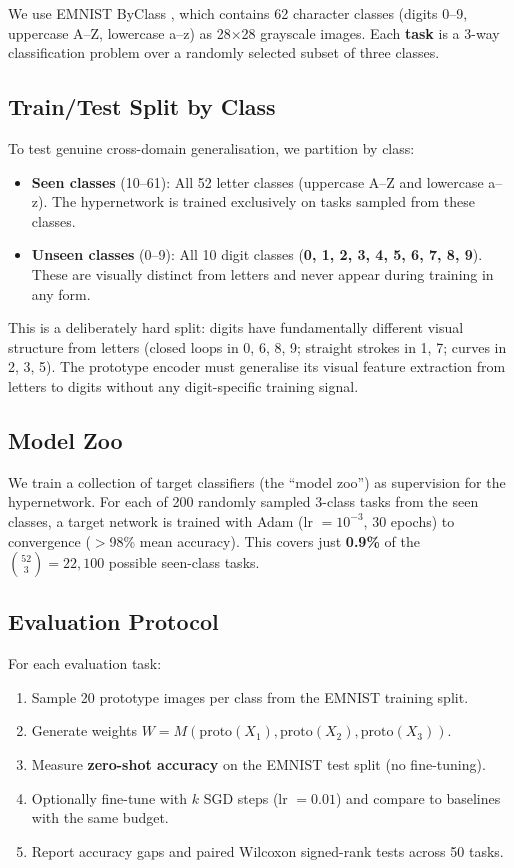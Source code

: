 \documentclass[11pt,a4paper]{article}
\begin{document}
We use EMNIST ByClass \cite{cohen2017emnist}, which contains 62 character classes (digits 0--9, uppercase A--Z, lowercase a--z) as 28$\times$28 grayscale images. Each \textbf{task} is a 3-way classification problem over a randomly selected subset of three classes.

\subsection{Train/Test Split by Class}

To test genuine cross-domain generalisation, we partition by class:
\begin{itemize}[noitemsep]
    \item \textbf{Seen classes} (10--61): All 52 letter classes (uppercase A--Z and lowercase a--z). The hypernetwork is trained exclusively on tasks sampled from these classes.
    \item \textbf{Unseen classes} (0--9): All 10 digit classes (\textbf{0, 1, 2, 3, 4, 5, 6, 7, 8, 9}). These are visually distinct from letters and never appear during training in any form.
\end{itemize}

This is a deliberately hard split: digits have fundamentally different visual structure from letters (closed loops in 0, 6, 8, 9; straight strokes in 1, 7; curves in 2, 3, 5). The prototype encoder must generalise its visual feature extraction from letters to digits without any digit-specific training signal.

\subsection{Model Zoo}

We train a collection of target classifiers (the ``model zoo'') as supervision for the hypernetwork. For each of 200 randomly sampled 3-class tasks from the seen classes, a target network is trained with Adam (lr $= 10^{-3}$, 30 epochs) to convergence ($>$98\% mean accuracy). This covers just \textbf{0.9\%} of the $\binom{52}{3} = 22{,}100$ possible seen-class tasks.

\subsection{Evaluation Protocol}

For each evaluation task:
\begin{enumerate}[noitemsep]
    \item Sample 20 prototype images per class from the EMNIST training split.
    \item Generate weights $W = M(\text{proto}(X_1), \text{proto}(X_2), \text{proto}(X_3))$.
    \item Measure \textbf{zero-shot accuracy} on the EMNIST test split (no fine-tuning).
    \item Optionally fine-tune with $k$ SGD steps (lr $= 0.01$) and compare to baselines with the same budget.
    \item Report accuracy gaps and paired Wilcoxon signed-rank tests across 50 tasks.
\end{enumerate}
\end{document}
